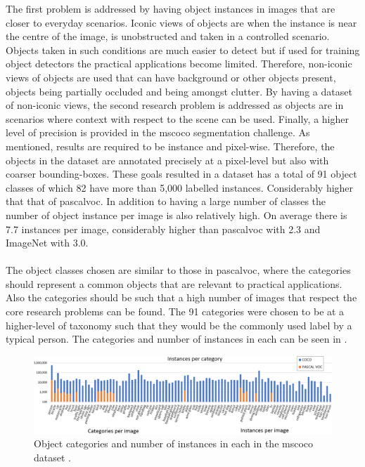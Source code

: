 The first problem is addressed by having object instances in images that are closer to everyday scenarios. Iconic views of objects are when the instance is near the centre of the image, is unobstructed and taken in a controlled scenario. Objects taken in such conditions are much easier to detect but if used for training object detectors the practical applications become limited. Therefore, non-iconic views of objects are used that can have background or other objects present, objects being partially occluded and being amongst clutter. By having a dataset of non-iconic views, the second research problem is addressed as objects are in scenarios where context with respect to the scene can be used. Finally, a higher level of precision is provided in the \gls{mscoco} segmentation challenge. As mentioned, results are required to be instance and pixel-wise. Therefore, the objects in the dataset are annotated precisely at a pixel-level but also with coarser bounding-boxes. These goals resulted in a dataset has a total of 91 object classes of which 82 have more than 5,000 labelled instances. Considerably higher that that of \gls{pascalvoc}. In addition to having a large number of classes the number of object instance per image is also relatively high. On average there is 7.7 instances per image, considerably higher than \gls{pascalvoc} with 2.3 and ImageNet with 3.0. 
\\\\
The object classes chosen are similar to those in \gls{pascalvoc}, where the categories should represent a common objects that are relevant to practical applications. Also the categories should be such that a high number of images that respect the core research problems can be found. The 91 categories were chosen to be at a higher-level of taxonomy such that they would be the commonly used label by a typical person. The categories and number of instances in each can be seen in .

\begin{figure}[H]
  \centering
    \includegraphics[width=1.0\textwidth]{Figs/Problem/mscoco_cats.pdf}
    \caption{Object categories and number of instances in each in the \gls{mscoco} dataset \cite{mscoco}.}
    \label{fig:cocoinstances}
\end{figure}


